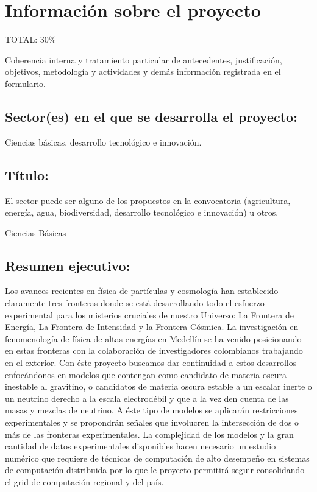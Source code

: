 
\section{Información sobre el proyecto}
\begin{evaluacion}
  TOTAL: 30\%

  Coherencia interna y tratamiento particular  de antecedentes,
  justificación, objetivos, metodología y actividades y demás
  información registrada en el formulario.
\end{evaluacion}

\subsection{Sector(es)  en el que se desarrolla el proyecto:}
Ciencias básicas, desarrollo tecnológico e innovación.
\subsection{Título:                                        }
\begin{instrucciones}
  El sector puede ser alguno de los propuestos en la convocatoria
  (agricultura, energía, agua, biodiversidad, desarrollo tecnológico e
  innovación) u otros.
\end{instrucciones}
Ciencias Básicas
\subsection{Resumen ejecutivo:                            }
Los avances recientes en física de partículas y cosmología han
establecido claramente tres fronteras donde se está desarrollando todo
el esfuerzo experimental para los misterios cruciales de nuestro
Universo: La Frontera de Energía, La Frontera de Intensidad y la
Frontera Cósmica. La investigación en fenomenología de física de altas
energías en Medellín se ha venido posicionando en estas fronteras con
la colaboración de investigadores colombianos trabajando en el
exterior. Con éste proyecto buscamos dar continuidad a estos
desarrollos enfocándonos en modelos que contengan como candidato de
materia oscura inestable al gravitino, o candidatos de materia oscura
estable a un escalar inerte o un neutrino derecho a la escala
electrodébil y que a la vez den cuenta de las masas y mezclas de
neutrino. A éste tipo de modelos se aplicarán restricciones
experimentales y se propondrán señales que involucren la intersección
de dos o más de las fronteras experimentales. La complejidad de los
modelos y la gran cantidad de datos experimentales disponibles hacen
necesario un estudio numérico que requiere de técnicas de computación
de alto desempeño en sistemas de computación distribuida por lo que le
proyecto permitirá seguir consolidando el grid de computación regional
y del país.

